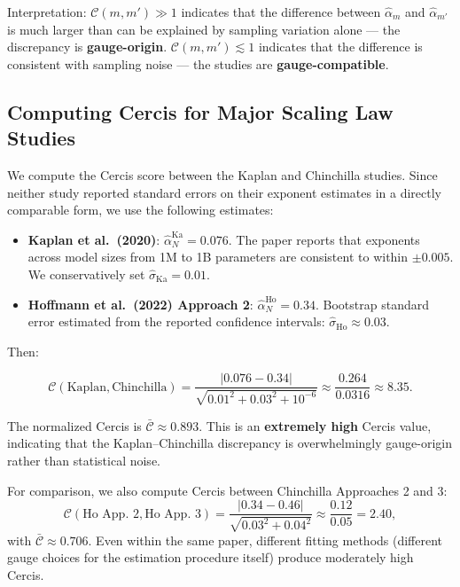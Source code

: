 \documentclass[12pt,a4paper]{article}
\theoremstyle{remark}
\newcommand{\cercis}{\mathcal{C}}
\newcommand{\cercisnorm}{\bar{\mathcal{C}}}
\begin{document}
Interpretation: $\cercis(m, m') \gg 1$ indicates that the difference between $\hat{\alpha}_m$ and $\hat{\alpha}_{m'}$ is much larger than can be explained by sampling variation alone — the discrepancy is \textbf{gauge-origin}. $\cercis(m, m') \lesssim 1$ indicates that the difference is consistent with sampling noise — the studies are \textbf{gauge-compatible}.

\subsection{Computing Cercis for Major Scaling Law Studies}

We compute the Cercis score between the Kaplan and Chinchilla studies. Since neither study reported standard errors on their exponent estimates in a directly comparable form, we use the following estimates:

\begin{itemize}
    \item \textbf{Kaplan et al.\ (2020)}: $\hat{\alpha}_N^{\text{Ka}} = 0.076$. The paper reports that exponents across model sizes from 1M to 1B parameters are consistent to within $\pm 0.005$. We conservatively set $\hat{\sigma}_{\text{Ka}} = 0.01$.
    \item \textbf{Hoffmann et al.\ (2022) Approach 2}: $\hat{\alpha}_N^{\text{Ho}} = 0.34$. Bootstrap standard error estimated from the reported confidence intervals: $\hat{\sigma}_{\text{Ho}} \approx 0.03$.
\end{itemize}

Then:

\begin{equation}
\cercis(\text{Kaplan}, \text{Chinchilla}) = \frac{|0.076 - 0.34|}{\sqrt{0.01^2 + 0.03^2 + 10^{-6}}} \approx \frac{0.264}{0.0316} \approx 8.35.
\end{equation}

The normalized Cercis is $\cercisnorm \approx 0.893$. This is an \textbf{extremely high} Cercis value, indicating that the Kaplan--Chinchilla discrepancy is overwhelmingly gauge-origin rather than statistical noise.

For comparison, we also compute Cercis between Chinchilla Approaches 2 and 3:
\begin{equation}
\cercis(\text{Ho App.~2}, \text{Ho App.~3}) = \frac{|0.34 - 0.46|}{\sqrt{0.03^2 + 0.04^2}} \approx \frac{0.12}{0.05} = 2.40,
\end{equation}
with $\cercisnorm \approx 0.706$. Even within the same paper, different fitting methods (different gauge choices for the estimation procedure itself) produce moderately high Cercis.
\end{document}
